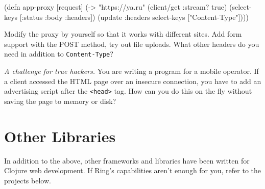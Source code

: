\else

\begin{english}
  \begin{clojure}
(defn app-proxy [request]
  (-> "https://ya.ru"
      (client/get {:stream? true})
      (select-keys [:status :body :headers])
      (update :headers select-keys ["Content-Type"])))
  \end{clojure}
\end{english}

\fi

Modify the proxy by yourself so that it works with different sites. Add form support with the POST method, try out file uploads. What other headers do you need in addition to \verb|Content-Type|?

\emph{A challenge for true hackers.} You are writing a program for a mobile operator. If a client accessed the HTML page over an insecure connection, you have to add an advertising script after the \verb|<head>| tag. How can you do this on the fly without saving the page to memory or disk?

\section{Other Libraries}

In addition to the above, other frameworks and libraries have been written for Clojure web development. If Ring's capabilities aren't enough for you, refer to the projects below.

